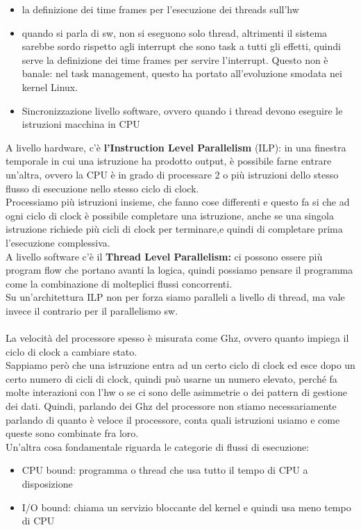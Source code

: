 \documentclass[12pt, oneside]{extbook}
\begin{document}
\begin{itemize}
\item la definizione dei time frames per l'esecuzione dei threads sull'hw
\item quando si parla di sw, non si eseguono solo thread, altrimenti il sistema sarebbe sordo rispetto agli interrupt che sono task a tutti gli effetti, quindi serve la definizione dei time frames per servire l'interrupt. Questo non è banale: nel task management, questo ha portato all'evoluzione smodata nei kernel Linux.
\item Sincronizzazione livello software, ovvero quando i thread devono eseguire le istruzioni macchina in CPU
\end{itemize}A livello hardware, c'è \textbf{l'Instruction Level Parallelism} (ILP): in una finestra temporale in cui una istruzione ha prodotto output, è possibile farne entrare un'altra, ovvero la CPU è in grado di processare 2 o più istruzioni dello stesso flusso di esecuzione nello stesso ciclo di clock.\\ Processiamo più istruzioni insieme, che fanno cose differenti e questo fa si che ad ogni ciclo di clock è possibile completare una istruzione, anche se una singola istruzione richiede più cicli di clock per terminare,e quindi di completare prima l'esecuzione complessiva.\\ A livello software c'è il \textbf{Thread Level Parallelism: }ci possono essere più program flow che portano avanti la logica, quindi possiamo pensare il programma come la combinazione di molteplici flussi concorrenti.\\ Su un'architettura ILP non per forza siamo paralleli a livello di thread, ma vale invece il contrario per il parallelismo sw.\\\\ La velocità del processore spesso è misurata come Ghz, ovvero quanto impiega il ciclo di clock a cambiare stato.\\ Sappiamo però che una istruzione entra ad un certo ciclo di clock ed esce dopo un certo numero di cicli di clock, quindi può usarne un numero elevato, perché fa molte interazioni con l'hw o se ci sono delle asimmetrie o dei pattern di gestione dei dati. Quindi, parlando dei Ghz del processore non stiamo necessariamente parlando di quanto è veloce il processore, conta quali istruzioni usiamo e come queste sono combinate fra loro.\\ Un'altra cosa fondamentale riguarda le categorie di flussi di esecuzione:
\begin{itemize}
\item CPU bound: programma o thread che usa tutto il tempo di CPU a disposizione
\item I/O bound: chiama un servizio bloccante del kernel e quindi usa meno tempo di CPU
\end{itemize}
\end{document}
